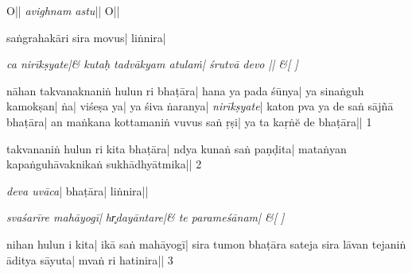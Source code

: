 \documentclass[11pt,twoside]{book}
\begin{document}
\beginnumbering
  \autopar

\skipnumbering
\centering{||} O{||} \textit{avighnam astu}{||} O{||}

\pstart
\noindent{} saṅgrahakāri sira movus{|} liṅnira{|}
\pend

\stanza
\hidenumbering\itshape{}  ca  nirīkṣyate{|}&
\hidenumbering\itshape kutaḥ tadvākyam atulaṁ{|} śrutvā devo  {||} \&[ ]


\pstart
nāhan takvanaknaniṅ hulun ri bhaṭāra{|} hana ya pada śūnya{|} ya sinaṅguh ka\-mo\-kṣan{|} ṅa{|} viśeṣa ya{|} ya śiva ṅaranya{|} \textit{nirīkṣyate}{|} katon pva ya de saṅ  sājñā bhaṭāra{|} an maṅkana kottamaniṅ vuvus saṅ ṛṣi{|} ya ta kaṛṅĕ de bhaṭāra{||} 1
\pend

\pstart
{}  takvananiṅ hulun ri kita bha\-ṭā\-ra{|} ndya kunaṅ  saṅ paṇḍita{|} mataṅyan kapaṅguhāvaknikaṅ sukhādhyātmika{||} 2
\pend

\textit{deva uvāca}{|}  bhaṭāra{|} liṅnira{||}

\stanza
\hidenumbering\itshape
svaśarīre mahāyogī{|}  hr̥dayāntare{|}&
\hidenumbering\itshape{}  te parameśānam{|}  \&[ ]

\pstart
nihan  hulun i kita{|} ikā saṅ mahāyogī{|} sira tumon bhaṭāra  sateja sira lāvan tejaniṅ āditya sāyuta{|}   mvaṅ ri hatinira{||} 3
\pend

\endnumbering
\end{document}
